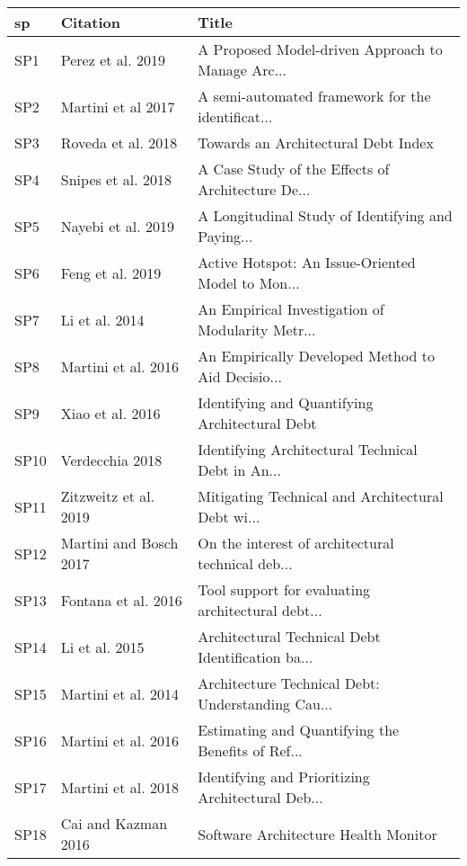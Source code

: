 \begin{tabular}{lll}
\toprule
   sp &                        Citation &                                              Title \\
\midrule
  SP1 &               Perez et al. 2019 &  A Proposed Model-driven Approach to Manage Arc... \\
  SP2 &              Martini et al 2017 &  A semi-automated framework for the identificat... \\
  SP3 &              Roveda et al. 2018 &                Towards an Architectural Debt Index \\
  SP4 &              Snipes et al. 2018 &  A Case Study of the Effects of Architecture De... \\
  SP5 &              Nayebi et al. 2019 &  A Longitudinal Study of Identifying and Paying... \\
  SP6 &                Feng et al. 2019 &  Active Hotspot: An Issue-Oriented Model to Mon... \\
  SP7 &                  Li et al. 2014 &  An  Empirical Investigation of Modularity Metr... \\
  SP8 &             Martini et al. 2016 &  An Empirically Developed Method to Aid Decisio... \\
  SP9 &                Xiao et al. 2016 &    Identifying and Quantifying Architectural Debt  \\
 SP10 &                 Verdecchia 2018 &  Identifying Architectural Technical Debt in An... \\
 SP11 &           Zitzweitz et al. 2019 &  Mitigating Technical and Architectural Debt wi... \\
 SP12 &          Martini and Bosch 2017 &  On the interest of architectural technical deb... \\
 SP13 &             Fontana et al. 2016 &  Tool support for evaluating architectural debt... \\
 SP14 &                  Li et al. 2015 &  Architectural Technical Debt Identification ba... \\
 SP15 &             Martini et al. 2014 &  Architecture Technical Debt: Understanding Cau... \\
 SP16 &             Martini et al. 2016 &  Estimating and Quantifying the Benefits of Ref... \\
 SP17 &             Martini et al. 2018 &  Identifying and Prioritizing Architectural Deb... \\
 SP18 &             Cai and Kazman 2016 &               Software Architecture Health Monitor \\

\end{tabular}
